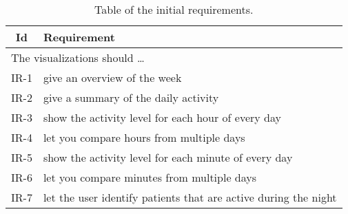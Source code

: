\begin{table}[h!]
  \begin{center}
  \begin{tabular}{|c|p{12cm}|}
    \hline
      \textbf{Id} & \textbf{Requirement} \\ \hline
    \multicolumn{2}{|l|}{The visualizations should \ldots} \\ \hline
      IR-1 & give an overview of the week \\ \hline
      IR-2 & give a summary of the daily activity \\ \hline
      IR-3 & show the activity level for each hour of every day \\ \hline
      IR-4 & let you compare hours from multiple days \\ \hline
      IR-5 & show the activity level for each minute of every day \\ \hline
      IR-6 & let you compare minutes from multiple days \\ \hline
      IR-7 & let the user identify patients that are active during the night \\ \hline
  \end{tabular}
  \end{center}
  \caption{Table of the initial requirements.} 
\end{table}
